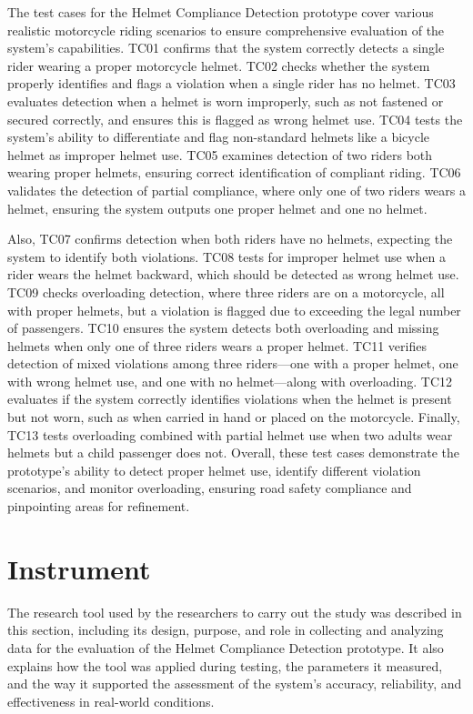 \begin{refsection}
\noindent

The test cases for the Helmet Compliance Detection prototype cover various realistic motorcycle riding scenarios to ensure comprehensive evaluation of the system’s capabilities. TC01 confirms that the system correctly detects a single rider wearing a proper motorcycle helmet. TC02 checks whether the system properly identifies and flags a violation when a single rider has no helmet. TC03 evaluates detection when a helmet is worn improperly, such as not fastened or secured correctly, and ensures this is flagged as wrong helmet use. TC04 tests the system’s ability to differentiate and flag non-standard helmets like a bicycle helmet as improper helmet use. TC05 examines detection of two riders both wearing proper helmets, ensuring correct identification of compliant riding. TC06 validates the detection of partial compliance, where only one of two riders wears a helmet, ensuring the system outputs one proper helmet and one no helmet. 

Also, TC07 confirms detection when both riders have no helmets, expecting the system to identify both violations. TC08 tests for improper helmet use when a rider wears the helmet backward, which should be detected as wrong helmet use. TC09 checks overloading detection, where three riders are on a motorcycle, all with proper helmets, but a violation is flagged due to exceeding the legal number of passengers. TC10 ensures the system detects both overloading and missing helmets when only one of three riders wears a proper helmet. TC11 verifies detection of mixed violations among three riders—one with a proper helmet, one with wrong helmet use, and one with no helmet—along with overloading. TC12 evaluates if the system correctly identifies violations when the helmet is present but not worn, such as when carried in hand or placed on the motorcycle. Finally, TC13 tests overloading combined with partial helmet use when two adults wear helmets but a child passenger does not. Overall, these test cases demonstrate the prototype’s ability to detect proper helmet use, identify different violation scenarios, and monitor overloading, ensuring road safety compliance and pinpointing areas for refinement.


\section*{Instrument}

The research tool used by the researchers to carry out the study was described in this section, including its design, purpose, and role in collecting and analyzing data for the evaluation of the Helmet Compliance Detection prototype. It also explains how the tool was applied during testing, the parameters it measured, and the way it supported the assessment of the system’s accuracy, reliability, and effectiveness in real-world conditions.


\end{refsection}
